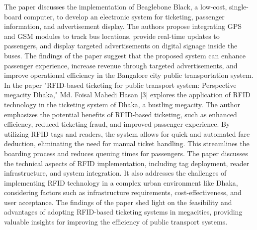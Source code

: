 \documentclass[conference]{IEEEtran}
\begin{document}
		The paper discusses the implementation of Beaglebone Black, a low-cost, single-board computer, to develop an electronic system for ticketing, passenger information, and advertisement display. The authors propose integrating GPS and GSM modules to track bus locations, provide real-time updates to passengers, and display targeted advertisements on digital signage inside the buses. The findings of the paper suggest that the proposed system can enhance passenger experience, increase revenue through targeted advertisements, and improve operational efficiency in the Bangalore city public transportation system.\\
 In the paper "RFID-based ticketing for public transport system: Perspective megacity Dhaka," Md. Foisal Mahedi Hasan [3] explores the application of RFID technology in the ticketing system of Dhaka, a bustling megacity. The author emphasizes the potential benefits of RFID-based ticketing, such as enhanced efficiency, reduced ticketing fraud, and improved passenger experience. By utilizing RFID tags and readers, the system allows for quick and automated fare deduction, eliminating the need for manual ticket handling. This streamlines the boarding process and reduces queuing times for passengers. The paper discusses the technical aspects of RFID implementation, including tag deployment, reader infrastructure, and system integration. It also addresses the challenges of implementing RFID technology in a complex urban environment like Dhaka, considering factors such as infrastructure requirements, cost-effectiveness, and user acceptance. The findings of the paper shed light on the feasibility and advantages of adopting RFID-based ticketing systems in megacities, providing valuable insights for improving the efficiency of public transport systems.
\end{document}
